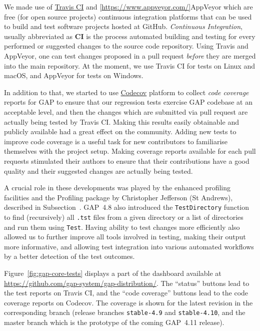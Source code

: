 \documentclass{deliverablereport}
\begin{document}
We made use of \href{https://travis-ci.org/}{Travis CI} and
\ref{https://www.appveyor.com/}{AppVeyor} which are 
free (for open source projects) continuous integration platforms 
that can be used to build and test software projects hosted at GitHub.
\emph{Continuous Integration}, usually abbreviated as {\bf CI} is the process
automated building and testing for every performed or suggested changes to 
the source code repository. Using Travis and AppVeyor, one can test changes proposed
in a pull request \emph{before} they are merged into the main repository.
At the moment, we use Travis CI for tests on Linux and macOS, and 
AppVeyor for tests on Windows.

In addition to that, we started to use \href{https://codecov.io/}{Codecov}
platform to collect \emph{code coverage} reports for GAP to ensure that our
regression tests exercise GAP codebase at an acceptable level, and then
the changes which are submitted via pull request are actually being tested
by Travis CI. Making this results easily obtainable and publicly available
had a great effect on the community. Adding new tests to improve code coverage
is a useful task for new contributors to familiarise themselves with the
project setup. Making coverage reports available for each pull requests
stimulated their authors to ensure that their contributions have a good
quality and their suggested changes are actually being tested.

A crucial role in these developments was played by the enhanced
profiling facilities and the {\sf Profiling} package by Christopher
Jefferson (St Andrews), described in Subsection~\label{gap-4.8}. 
GAP~4.8 also introduced the {\tt TestDirectory} function to find
(recursively) all {\tt .tst} files from a given directory or a list of 
directories and run them using {\tt Test}. Having ability to test
changes more efficiently also allowed us to further improve all 
tools involved in testing, making their output more informative,
and allowing test integration into various automated workflows
by a better detection of the test outcomes.

Figure~\ref{fig:gap-core-tests} displays a part of the dashboard
available at \url{https://github.com/gap-system/gap-distribution/}.
The ``status'' buttons lead to the test reports on Travis CI, and
the ``code coverage'' buttons lead to the code coverage reports on
Codecov. The coverage is shown for the latest revision in the
corresponding branch (release branches {\tt stable-4.9} and {\tt stable-4.10},
and the master branch which is the prototype of the coming GAP~4.11 release).
\end{document}

